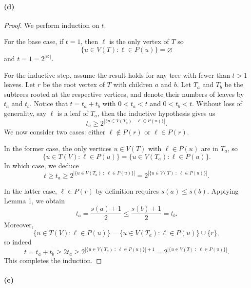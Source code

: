 \documentclass[12pt]{article}
\newcommand{\pnum}[1]{\paragraph{#1}}
\theoremstyle{definition}
\renewcommand{\emptyset}{\varnothing}
\newcommand{\<}{\langle}
\renewcommand{\>}{\rangle}
\begin{document}
\pnum{(d)}

\begin{proof}
    We perform induction on $t$.

    For the base case, if $t = 1$, then $\ell$ is the only vertex of $T$ so
    \[
        \{u \in V(T) : \ell \in P(u)\} = \emptyset
    \]
    and $t = 1 = 2^{|\emptyset|}$.

    For the inductive step, assume the result holds for any tree with fewer than $t > 1$ leaves.
    Let $r$ be the root vertex of $T$ with children $a$ and $b$.
    Let $T_a$ and $T_b$ be the subtrees rooted at the respective vertices, and denote their numbers of leaves by $t_a$ and $t_b$.
    Notice that $t = t_a + t_b$ with $0 < t_a < t$ and $0 < t_b < t$.
    Without loss of generality, say $\ell$ is a leaf of $T_a$, then the inductive hypothesis gives us
    \[
        t_a \geq 2^{|\{u \in V(T_a) \;:\; \ell \in P(u)\}|}.
    \]
    We now consider two cases: either $\ell \notin P(r)$ or $\ell \in P(r)$.

    In the former case, the only vertices $u \in V(T)$ with $\ell \in P(u)$ are in $T_a$, so
    \[
        \{u \in T(V) : \ell \in P(u)\} = \{u \in V(T_a) : \ell \in P(u)\}.
    \]
    In which case, we deduce
    \[
        t
            \geq t_a
            \geq 2^{|\{u \in V(T_a) \;:\; \ell \in P(u)\}|}
            = 2^{|\{u \in V(T) \;:\; \ell \in P(u)\}|}.
    \]

    In the latter case, $\ell \in P(r)$ by definition requires $s(a) \leq s(b)$.
    Applying Lemma 1, we obtain
    \[
        t_a = \frac{s(a) + 1}{2} \leq \frac{s(b) + 1}{2} = t_b.
    \]
    Moreover,
    \[
        \{u \in T(V) : \ell \in P(u)\} = \{u \in V(T_a) : \ell \in P(u)\} \cup \{r\},
    \]
    so indeed
    \[
        t
            = t_a + t_b
            \geq 2t_a
            \geq 2^{|\{u \in V(T_a) \;:\; \ell \in P(u)\}| + 1}
            = 2^{|\{u \in V(T) \;:\; \ell \in P(u)\}|}.
    \]
    This completes the induction.
\end{proof}


\pnum{(e)}
\end{document}
